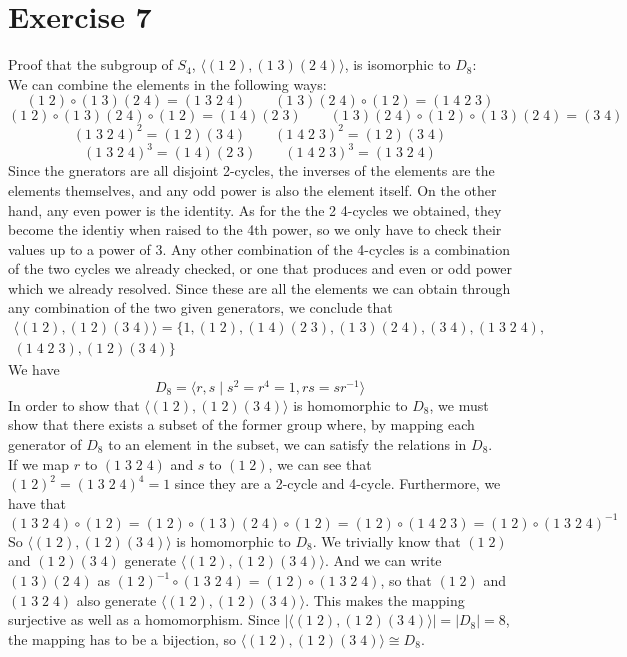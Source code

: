 \documentclass[12pt]{article}
\begin{document}
    \section*{Exercise 7}
    Proof that the subgroup of $S_4$,
    $\langle (1\;2), (1\;3)(2\;4) \rangle$,
    is isomorphic to $D_8$: \\
    We can combine the elements in the following ways:
    \[ (1\;2) \circ (1\;3)(2\;4) = (1\;3\;2\;4) \qquad
    (1\;3)(2\;4) \circ (1\;2) = (1\;4\;2\;3) \]
    \[ (1\;2) \circ (1\;3)(2\;4) \circ (1\;2) = (1\;4)(2\;3) \qquad
    (1\;3)(2\;4) \circ (1\;2) \circ (1\;3)(2\;4) = (3\;4) \]
    \[ (1\;3\;2\;4)^2 = (1\;2)(3\;4) \qquad
    (1\;4\;2\;3)^2 = (1\;2)(3\;4) \]
    \[ (1\;3\;2\;4)^3 = (1\;4)(2\;3) \qquad
    (1\;4\;2\;3)^3 = (1\;3\;2\;4) \]
    Since the gnerators are all disjoint 2-cycles,
    the inverses of the elements are the elements themselves,
    and any odd power is also the element itself.
    On the other hand, any even power is the identity.
    As for the the 2 4-cycles we obtained,
    they become the identiy when raised to the 4th power,
    so we only have to check their values up to a power of 3.
    Any other combination of the 4-cycles
    is a combination of the two cycles we already checked,
    or one that produces and even or odd power
    which we already resolved.
    Since these are all the elements we can obtain
    through any combination of the two given generators,
    we conclude that 
    \begin{align*}
        \langle (1\;2), (1\;2)(3\;4) \rangle
        = \{1, (1\;2), (1\;4)(2\;3), (1\;3)(2\;4), (3\;4), (1\;3\;2\;4), \\
        (1\;4\;2\;3), (1\;2)(3\;4) \}
    \end{align*}
    We have 
    \[D_{8} = \langle r, s \mid s^2 = r^4 = 1, rs = sr^{-1} \rangle\]
    In order to show that $\langle (1\;2), (1\;2)(3\;4) \rangle$
    is homomorphic to $D_8$,
    we must show that there exists a subset of the former group
    where, by mapping each generator of $D_8$ to an element in the subset,
    we can satisfy the relations in $D_8$. \\
    If we map $r$ to $(1\;3\;2\;4)$
    and $s$ to $(1\;2)$,
    we can see that $(1\;2)^2 = (1\;3\;2\;4)^4 = 1$
    since they are a 2-cycle and 4-cycle.
    Furthermore, we have that
    \[ (1\;3\;2\;4) \circ (1\;2) = (1\;2) \circ (1\;3)(2\;4) \circ (1\;2)
    = (1\;2) \circ (1\;4\;2\;3)
    = (1\;2) \circ (1\;3\;2\;4)^{-1} \]
    So $\langle (1\;2), (1\;2)(3\;4) \rangle$ is homomorphic to $D_8$.
    We trivially know that $(1\;2)$ and $(1\;2)(3\;4)$
    generate $\langle (1\;2), (1\;2)(3\;4) \rangle$.
    And we can write $(1\;3)(2\;4)$
    as $(1\;2)^{-1} \circ (1\;3\;2\;4) = (1\;2) \circ (1\;3\;2\;4)$,
    so that $(1\;2)$ and $(1\;3\;2\;4)$
    also generate $\langle (1\;2), (1\;2)(3\;4) \rangle$.
    This makes the mapping surjective as well as a homomorphism.
    Since $|\langle (1\;2), (1\;2)(3\;4) \rangle| = |D_8| = 8$,
    the mapping has to be a bijection,
    so $\langle (1\;2), (1\;2)(3\;4) \rangle \cong D_8$.
\end{document}
